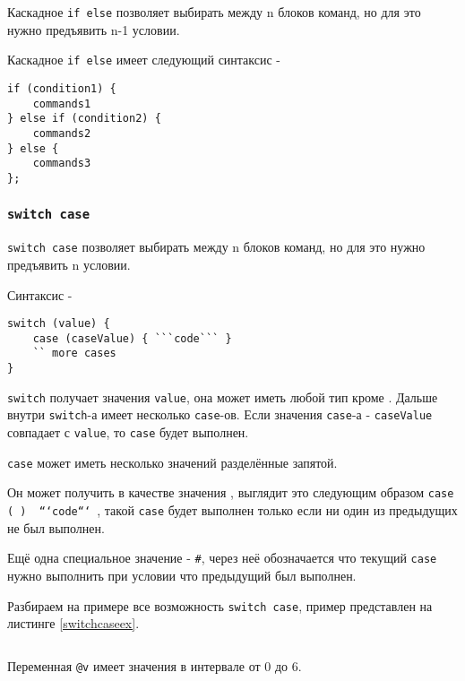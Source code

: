 Каскадное \texttt{if else} позволяет выбирать между n блоков команд, но для это нужно предъявить n-1 условии.

Каскадное \texttt{if else} имеет следующий синтаксис -
\begin{verbatim}
if (condition1) {
	commands1
} else if (condition2) {
	commands2
} else {
	commands3
};
\end{verbatim}

\subsubsection{\texttt{switch case}}

\texttt{switch case} позволяет выбирать между n блоков команд, но для это нужно предъявить n условии.

Синтаксис -
\begin{verbatim}
switch (value) {
	case (caseValue) { ```code``` }
	`` more cases
}
\end{verbatim}

\texttt{switch} получает значения \texttt{value}, она может иметь любой тип кроме \bool. Дальше внутри \texttt{switch}-а имеет несколько \texttt{case}-ов. Если значения \texttt{case}-а - \texttt{caseValue} совпадает с \texttt{value}, то \texttt{case} будет выполнен.

\texttt{case} может иметь несколько значений разделённые запятой.

Он может получить в качестве значения \void, выглядит это следующим образом \texttt{case (~) { ```code``` }}, такой \texttt{case} будет выполнен только если ни один из предыдущих не был выполнен.

Ещё одна специальное значение - \texttt{#}, через неё обозначается что текущий \texttt{case} нужно выполнить при условии что предыдущий был выполнен.

Разбираем на примере все возможность \texttt{switch case}, пример представлен на листинге \ref{switchcaseex}.

\begin{sourcecode}
	\label{switchcaseex}
    \inputminted[linenos]{icl}{../sources/switchcaseex.icL}
\end{sourcecode}

Переменная \texttt{@v} имеет значения в интервале от 0 до 6.

